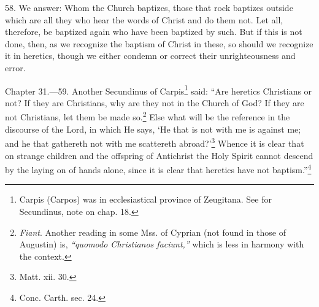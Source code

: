 58. We answer: Whom the Church baptizes, those that rock baptizes outside which are all they who hear the words of Christ and do them not. Let all, therefore, be baptized again who have been baptized by such. But if this is not done, then, as we recognize the baptism of Christ in these, so should we recognize it in heretics, though we either condemn or correct their unrighteousness and error.


Chapter 31.—59. Another Secundinus of Carpis\footnote{\par  Carpis (Carpos) was in ecclesiastical province of Zeugitana. See for Secundinus, note on chap. 18.} said: ``Are heretics Christians or not? If they are Christians, why are they not in the Church of God? If they are not Christians, let them be made so.\footnote{\par  \emph{Fiant}. Another reading in some Mss. of Cyprian (not found in those of Augustin) is, \emph{``quomodo Christianos faciunt,''} which is less in harmony with the context.} Else what will be the reference in the discourse of the Lord, in which He says, ‘He that is not with me is against me; and he that gathereth not with me scattereth abroad?’\footnote{\par  Matt. xii. 30.} Whence it is clear that on strange children and the offspring of Antichrist the Holy Spirit cannot descend by the laying on of hands alone, since it is clear that heretics have not baptism.''\footnote{\par  Conc. Carth. sec. 24.}

